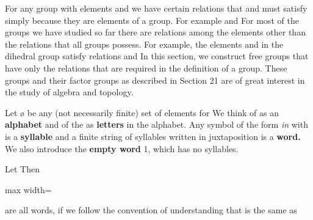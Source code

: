 \documentclass[11pt,oneside]{article}
\begin{document}
\fi
\renewcommand{\BookFooter}{Section 20 Free Groups}
\ifdefined\BookMaster\else\setcounter{page}{172}\fi
\BookNarrativetrue

\begin{BookBody}


\noindent For any group with elements  and  we have certain relations that  and  must satisfy simply because they are elements of a group. For example and   For most of the groups we have studied so far there are relations among the elements other than the relations that all groups possess. For example, the elements \BookInline{\mu } and \BookInline{\rho } in the dihedral group  satisfy relations  and  In this section, we construct free groups that have only the relations that are required in the definition of a group. These groups and their factor groups as described in Section 21 are of great interest in the study of algebra and topology.


\noindent Let  ø be any (not necessarily finite) set of elements  for  We think of  as an\textbf{ alphabet} and of the  as\textbf{ letters} in the alphabet. Any symbol of the form \textit{in} with  is a\textbf{ syllable} and a finite string  of syllables written in juxtaposition is a\textbf{ word.} We also introduce the\textbf{ empty word} 1, which has no syllables.

 Let  Then

\begin{center}\begin{adjustbox}{max width=\linewidth}\end{adjustbox}\end{center}

\noindent are all words, if we follow the convention of understanding that  is the same as  \BookEnd{\blacktriangle}

\end{BookBody}
\end{document}
